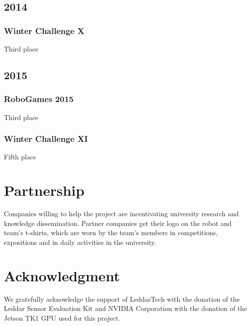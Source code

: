 \documentclass[conference]{IEEEtran}
\begin{document}
\subsection*{2014}
\setcounter{subsubsection}{0}
\subsubsection{Winter Challenge X} Third place
\subsection*{2015}
\setcounter{subsubsection}{0}
\subsubsection{RoboGames 2015} Third place
\subsubsection{Winter Challenge XI} Fifth place

\section{Partnership}
Companies willing to help the project are incentivating university research and
knowledge dissemination. Partner companies get their logo on the robot and team's
t-shirts, which are worn by the team's members in competitions, expositions
and in daily activities in the university.

\section*{Acknowledgment}
We gratefully acknowledge the support of LeddarTech with the donation of the
Leddar Sensor Evaluation Kit and NVIDIA Corporation with the donation of
the Jetson TK1 GPU used for this project.
\end{document}
